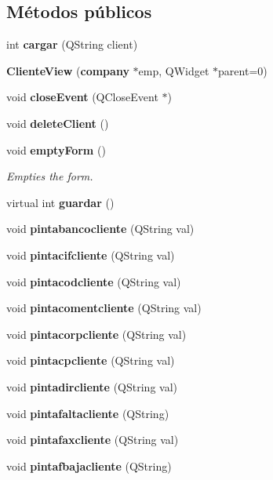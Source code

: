 \subsection*{M\'{e}todos p\'{u}blicos}
\begin{CompactItemize}
\item 
int {\bf cargar} (QString client)
\item 
{\bf Cliente\-View} ({\bf company} $\ast$emp, QWidget $\ast$parent=0)
\item 
void {\bf close\-Event} (QClose\-Event $\ast$)\label{classClienteView_a2}

\item 
void {\bf delete\-Client} ()
\item 
void {\bf empty\-Form} ()\label{classClienteView_a4}

\begin{CompactList}\small\item\em Empties the form. \item\end{CompactList}\item 
virtual int {\bf guardar} ()
\item 
void {\bf pintabancocliente} (QString val)\label{classClienteView_a6}

\item 
void {\bf pintacifcliente} (QString val)\label{classClienteView_a7}

\item 
void {\bf pintacodcliente} (QString val)\label{classClienteView_a8}

\item 
void {\bf pintacomentcliente} (QString val)\label{classClienteView_a9}

\item 
void {\bf pintacorpcliente} (QString val)\label{classClienteView_a10}

\item 
void {\bf pintacpcliente} (QString val)\label{classClienteView_a11}

\item 
void {\bf pintadircliente} (QString val)\label{classClienteView_a12}

\item 
void {\bf pintafaltacliente} (QString)\label{classClienteView_a13}

\item 
void {\bf pintafaxcliente} (QString val)\label{classClienteView_a14}

\item 
void {\bf pintafbajacliente} (QString)\label{classClienteView_a15}


\end{CompactItemize}
